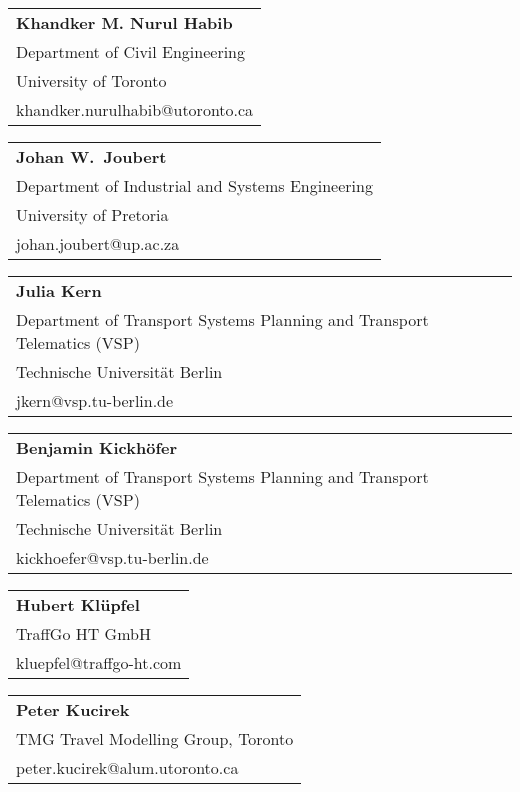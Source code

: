 \begin{tabular}[width=0.48\textwidth]{@{}l}
\textbf{Khandker M. Nurul Habib} \\
Department of Civil Engineering \\
University of Toronto \\
khandker.nurulhabib@utoronto.ca  \\
\end{tabular}

\begin{tabular}[width=0.48\textwidth]{@{}l}
\textbf{Johan W.\ Joubert} \\
Department of Industrial and Systems Engineering \\
University of Pretoria \\
johan.joubert@up.ac.za  \\
\end{tabular}

\begin{tabular}[width=0.48\textwidth]{@{}l}
\textbf{Julia Kern} \\
Department of Transport Systems Planning and Transport Telematics (VSP) \\
Technische Universität Berlin \\
jkern@vsp.tu-berlin.de \\
\end{tabular}

\begin{tabular}[width=0.48\textwidth]{@{}l}
\textbf{Benjamin Kickhöfer} \\
Department of Transport Systems Planning and Transport Telematics (VSP) \\
Technische Universität Berlin \\
kickhoefer@vsp.tu-berlin.de \\
\end{tabular}

\begin{tabular}[width=0.48\textwidth]{@{}l}
\textbf{Hubert Klüpfel} \\
TraffGo HT GmbH\\
kluepfel@traffgo-ht.com \\
\end{tabular}

\begin{tabular}[width=0.48\textwidth]{@{}l}
\textbf{Peter Kucirek} \\
TMG Travel Modelling Group, Toronto \\
peter.kucirek@alum.utoronto.ca  \\
\end{tabular}


